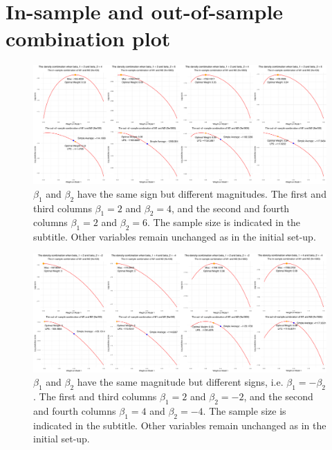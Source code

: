 \documentclass{monashthesis}
\begin{document}
\hypertarget{plot}{%
\section{In-sample and out-of-sample combination plot}\label{plot}}

\begin{figure}[ht]
\centering
\includegraphics[scale=0.18, angle=90]{figures/betamag11.jpg}
\caption{$\beta_1$ and $\beta_2$ have the same sign but different magnitudes. The first and third columns $\beta_1=2$ and $\beta_2=4$, and the second and fourth columns $\beta_1=2$ and $\beta_2=6$. The sample size is indicated in the subtitle. Other variables remain unchanged as in the initial set-up.}
\label{fig:magnitude}
\end{figure}

\begin{figure}[ht]
\centering
\includegraphics[scale=0.18, angle=90]{figures/betasign11.jpg}
\caption{$\beta_1$ and $\beta_2$ have the same magnitude but different signs, i.e. $\beta_1=-\beta_2$. The first and third columns $\beta_1=2$ and $\beta_2=-2$, and the second and fourth columns $\beta_1=4$ and $\beta_2=-4$. The sample size is indicated in the subtitle. Other variables remain unchanged as in the initial set-up.}
\label{fig:sign}
\end{figure}
\end{document}
